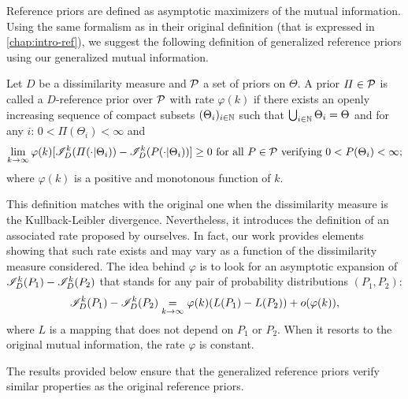 Reference priors are defined as asymptotic maximizers of the mutual information. Using the same formalism as in their original definition (that is expressed in \cref{chap:intro-ref}), we suggest the following definition of generalized reference priors using our generalized mutual information.

\begin{defi}\label{def:genref}
    Let $D$ be a dissimilarity measure and $\mathcal{P}$ a set of priors on $\Theta$. A prior $\varPi\in\mathcal{P}$ is called a $D$-reference prior over $\mathcal{P}$ with rate $\varphi(k)$ if there exists an openly increasing  sequence of compact subsets $(\Theta_i)_{i\in\mathbb{N}}$
    such that $\bigcup_{i\in\mathbb{N}}\Theta_i=\Theta$ and for any $i$: $0<\varPi(\Theta_i)<\infty $ and
        \begin{equation}\label{eq:defrefpriorsi}
            \lim_{k\rightarrow\infty}\varphi(k)[\sI^k_D(\varPi(\cdot|\Theta_i))-\sI^k_D(P(\cdot|\Theta_i))] \geq0 \text{\ for all\ } P\in\cP\text{\ verifying\ }0<P(\Theta_i)<\infty;
        \end{equation}
    where  $\varphi(k)$ is a {positive and}  monotonous function of $k$.
\end{defi}


This definition matches with the original one when the dissimilarity measure is the Kullback-Leibler divergence. Nevertheless, it introduces the definition of an associated rate proposed by ourselves. In fact, our
work provides elements showing that such rate exists and may vary as a function of the dissimilarity measure
considered.
The idea behind $\varphi$ is to look for an asymptotic expansion of $\mathscr{I}^k_D(P_1)-\mathscr{I}^k_D(P_2)$ that stands for any pair of probability distributions $(P_1,P_2)$:
    \begin{equation}
        \mathscr{I}^k_D(P_1)-\mathscr{I}^k_D(P_2) \overset{}{\underset{k\rightarrow\infty}{=}} \varphi(k)(L(P_1)-L(P_2)) + o(\varphi(k)),
    \end{equation}
where $L$ is a mapping that does not depend on $P_1$ or $P_2$.
When it resorts to the original mutual information, the rate $\varphi$ is constant.

The results provided below ensure that the generalized reference priors verify similar properties as the original reference priors.







